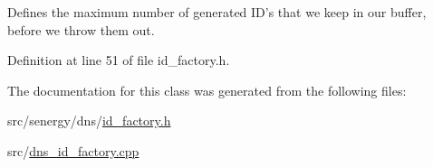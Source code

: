 Defines the maximum number of generated I\-D's that we keep in our buffer, before we throw them out. 



Definition at line 51 of file id\-\_\-factory.\-h.



The documentation for this class was generated from the following files\-:\begin{DoxyCompactItemize}
\item 
src/senergy/dns/\hyperlink{id__factory_8h}{id\-\_\-factory.\-h}\item 
src/\hyperlink{dns__id__factory_8cpp}{dns\-\_\-id\-\_\-factory.\-cpp}\end{DoxyCompactItemize}
